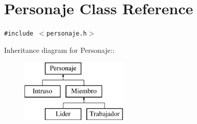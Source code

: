 \hypertarget{classPersonaje}{
\section{Personaje Class Reference}
\label{classPersonaje}
}
{\tt \#include $<$personaje.h$>$}

Inheritance diagram for Personaje::\begin{figure}[H]
\begin{center}
\leavevmode
\includegraphics[height=3cm]{classPersonaje}
\end{center}
\end{figure}
